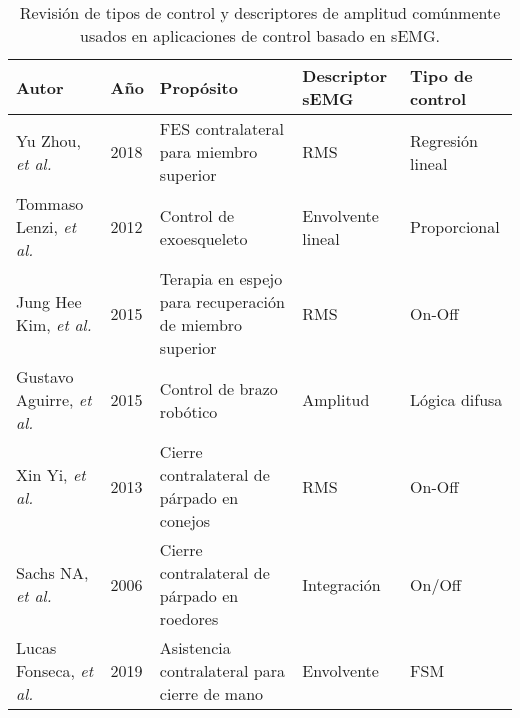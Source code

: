 \begin{table}[htb]
	\centering
	\begin{tabular}{|p{30mm}|p{10mm}|p{45mm}|p{25mm}|p{35mm}|}
	\hline
	\textbf{Autor} & \textbf{Año} & \textbf{Propósito} & \textbf{Descriptor sEMG} & \textbf{Tipo de control}\\
	\hline
	\hline
	Yu Zhou, \emph{et al.} \cite{Zhou2018} & 2018 & FES contralateral para miembro superior & RMS & Regresión lineal\\
	\hline
	Tommaso Lenzi, \emph{et al.} \cite{Lenzi2012} & 2012 & Control de exoesqueleto & Envolvente lineal & Proporcional\\
	\hline
	Jung Hee Kim, \emph{et al.} \cite{Kim2015} & 2015 & Terapia en espejo para recuperación de miembro superior & RMS & On-Off\\
	\hline
	Gustavo Aguirre, \emph{et al.} \cite{Aguirre-Vargas2015} & 2015 & Control de brazo robótico & Amplitud & Lógica difusa\\
	\hline
	Xin Yi, \emph{et al.} \cite{Yi2013} & 2013 & Cierre contralateral de párpado en conejos & RMS & On-Off\\
	\hline
	Sachs NA, \emph{et al.} \cite{Sachs2006} & 2006 & Cierre contralateral de párpado en roedores & Integración & On/Off\\
	\hline
	Lucas Fonseca, \emph{et al.} \cite{Fonseca2019} & 2019 & Asistencia contralateral para cierre de mano & Envolvente & FSM\\
	\hline
	\end{tabular}
	\caption{Revisión de tipos de control y descriptores de amplitud comúnmente usados en aplicaciones de control basado en sEMG.}
	\label{Cuadro:Control}
\end{table}
